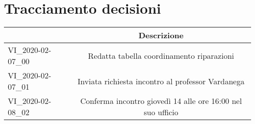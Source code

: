 \section{Tracciamento decisioni}
\renewcommand{\arraystretch}{1.8}

\begin{longtable}{|p{5cm}|c|}
	\hline
	
	\rowcolor{header}
	\centering{\textbf{Codice}} &  \textbf{Descrizione}\\
	
	\hline
	
	VI\_2020-02-07\_00 & Redatta tabella coordinamento riparazioni  \\
	VI\_2020-02-07\_01 & Inviata richiesta incontro al professor Vardanega  \\
	VI\_2020-02-08\_02 & Conferma incontro giovedì 14 alle ore 16:00 nel suo ufficio \\
	
	\hline
\end{longtable}